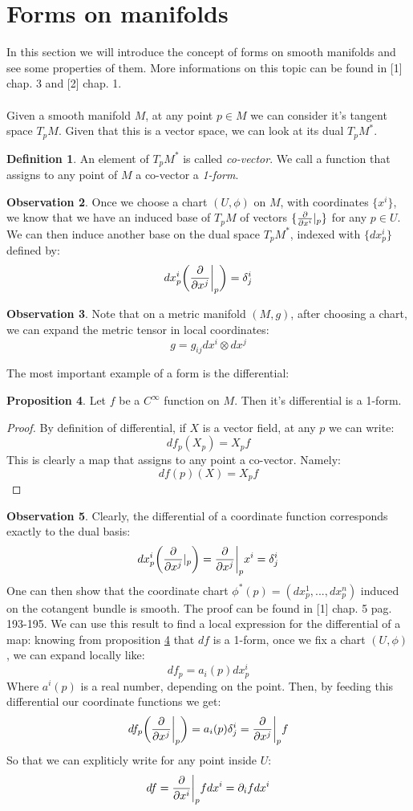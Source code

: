 \documentclass[12pt,a4paper]{report}
\theoremstyle{definition}
\newtheorem{Def}{Definition}[chapter]
\theoremstyle{Theorem}
\newtheorem{Prop}[Def]{Proposition}
\theoremstyle{definition}
\theoremstyle{definition}
\newtheorem{Obs}[Def]{Observation}
\begin{document}
	\section{Forms on manifolds}
	In this section we will introduce the concept of forms on smooth manifolds and see some properties of them. More informations on this topic can be found in [1] chap. 3 and [2] chap. 1.\\
	\\
	Given a smooth manifold $M$, at any point $p\in M$ we can consider it's tangent space $T_pM$. Given that this is a vector space, we can look at its dual $T_pM^*$. 
	\begin{Def}
		An element of $T_pM^*$ is called \textit{co-vector}. We call a function that assigns to any point of $M$ a co-vector a \textit{1-form}.
	\end{Def}
		\begin{Obs}
		Once we choose a chart $(U,\phi)$ on $M$, with coordinates $\{x^i\}$, we know that we have an induced base of $T_pM$ of vectors $\{{\partial\over \partial x^i}|_p\}$ for any $p\in U$. We can then induce another base on the dual space $T_pM^*$, indexed with $\{dx^i_p\}$ defined by:
		$$dx^i_p\bigg({\partial\over \partial x^j}\bigg|_p\bigg)=\delta^i_j$$
	\end{Obs}
	\begin{Obs}
		Note that on a metric manifold $(M,g)$, after choosing a chart, we can expand the metric tensor in local coordinates:
		$$g=g_{ij}dx^i\otimes dx^j$$  
	\end{Obs}
	The most important example of a form is the differential:
	\begin{Prop} \label{df_is_a_form}
		Let $f$ be a $C^\infty$ function on $M$. Then it's differential is a 1-form.
	\end{Prop}
	\begin{proof}
		By definition of differential, if $X$ is a vector field, at any $p$ we can write:
		$$df_p(X_p)=X_pf$$
		This is clearly a map that assigns to any point a co-vector. Namely:
		$$df(p)(X)=X_pf$$
	\end{proof}
	\begin{Obs}
		Clearly, the differential of a coordinate function corresponds exactly to the dual basis:
		$$dx^i_p\bigg({\partial\over \partial x^j}|_p\bigg)={\partial\over \partial x^j}\bigg|_px^i=\delta^i_j$$
		One can then show that the coordinate chart $\phi^*(p)=(dx^1_p,...,dx^n_p)$ induced on the cotangent bundle is smooth. The proof can be found in [1] chap. 5 pag. 193-195.
		We can use this result to find a local expression for the differential of a map:
		knowing from proposition \ref{df_is_a_form} that $df$ is a 1-form, once we fix a chart $(U,\phi)$, we can expand locally like:
		$$df_p=a_i(p)dx^i_p$$
		Where $a^i(p)$ is a real number, depending on the point.
		Then, by feeding this differential our coordinate functions we get:
		$$df_p\bigg({\partial\over \partial x^j}\bigg|_p\bigg)=a_i(p)\delta^i_j={\partial\over \partial x^j}\bigg|_pf$$
		So that we can expliticly write for any point inside $U$:
		$$df={\partial\over \partial x^i}\bigg|_pfdx^i=\partial_ifdx^i$$
	\end{Obs}
\end{document}
